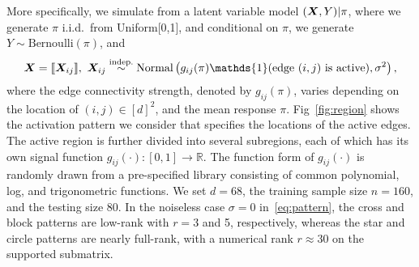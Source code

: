 \documentclass[11pt]{article}
\theoremstyle{plain}
\theoremstyle{definition}
\begin{document}
More specifically, we simulate from a latent variable model $(\bm X,Y)|\pi$, where we generate $\pi$ i.i.d.\ from Uniform[0,1], and conditional on $\pi$, we generate $Y \sim \text{Bernoulli}(\pi)$, and 
\begin{eqnarray}\label{eq:pattern}
\mX=\entry{\mX_{ij}},\  \mX_{ij}\stackrel{\text{indep.}}{\sim} \text{Normal}\left( g_{ij}(\pi)\mathds{1}(\text{edge $(i,j)$ is active}), \sigma^2 \right), 
\end{eqnarray}
where the edge connectivity strength, denoted by $g_{ij}(\pi)$, varies depending on the location of $(i,j)\in[d]^2$, and the mean response $\pi$. Fig~\ref{fig:region} shows the activation pattern we consider that specifies the locations of the active edges. The active region is further divided into several subregions, each of which has its own signal function $g_{ij}(\cdot)\colon [0,1]\to \mathbb{R}$. The function form of $g_{ij}(\cdot)$ is randomly drawn from a pre-specified library consisting of common polynomial, log, and trigonometric functions. We set $d=68$, the training sample size $n=160$, and the testing size $80$. In the noiseless case $\sigma=0$ in~\eqref{eq:pattern}, the cross and block patterns are low-rank with $r = 3$ and 5, respectively, whereas the star and circle patterns are nearly full-rank, with a numerical rank $r \approx 30$ on the supported submatrix. 
\end{document}
